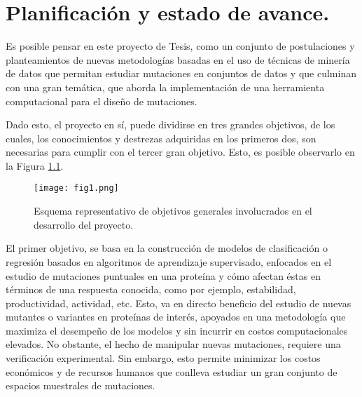 \chapter{Planificación y estado de avance.}

\ifpdf
    \graphicspath{{Chapter5/Figs/Raster/}{Chapter5/Figs/PDF/}{Chapter5/Figs/}}
\else
    \graphicspath{{Chapter5/Figs/Vector/}{Chapter5/Figs/}}
\fi

Es posible pensar en este proyecto de Tesis, como un conjunto de postulaciones y planteamientos de nuevas metodologías basadas en el uso de técnicas de minería de datos que permitan estudiar mutaciones en conjuntos de datos y que culminan con una gran temática, que aborda la implementación de una herramienta computacional para el diseño de mutaciones.

Dado esto, el proyecto en sí, puede dividirse en tres grandes objetivos, de los cuales, los conocimientos y destrezas adquiridas en los primeros dos, son necesarias para cumplir con el tercer gran objetivo. Esto, es posible observarlo en la Figura \ref{cap5:fig1}.

\begin{figure}[!h]
	
	\centering
	\texttt{[image: fig1.png]}
	\caption{Esquema representativo de objetivos generales involucrados en el desarrollo del proyecto.}
	\label{cap5:fig1}
\end{figure}

El primer objetivo, se basa en la construcción de modelos de clasificación o regresión basados en algoritmos de aprendizaje supervisado, enfocados en el estudio de mutaciones puntuales en una proteína y cómo afectan éstas en términos de una respuesta conocida, como por ejemplo, estabilidad, productividad, actividad, etc. Esto, va en directo beneficio del estudio de nuevas mutantes o variantes en proteínas de interés, apoyados en una metodología que maximiza el desempeño de los modelos y sin incurrir en costos computacionales elevados. No obstante, el hecho de manipular nuevas mutaciones, requiere una verificación experimental. Sin embargo, esto permite minimizar los costos económicos y de recursos humanos que conlleva estudiar un gran conjunto de espacios muestrales de mutaciones. 


